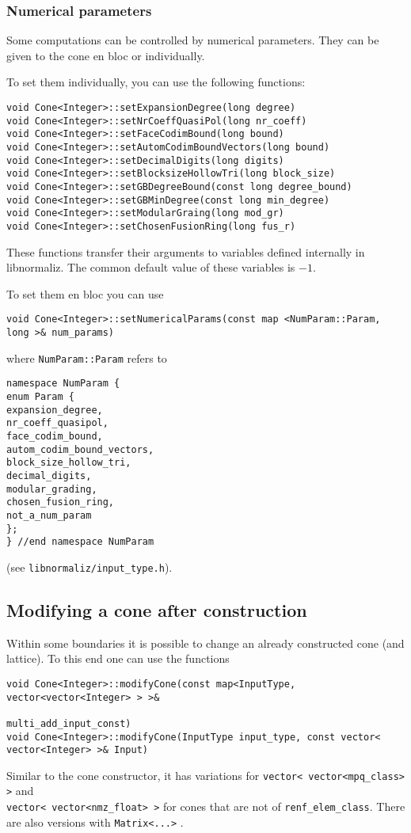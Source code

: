 \begin{small}
\subsubsection{Numerical parameters}\label{num_params}

Some computations can be controlled by numerical parameters. They can be given to the cone en bloc or individually.

To set them individually, you can use the following functions:
\begin{Verbatim}
void Cone<Integer>::setExpansionDegree(long degree)
void Cone<Integer>::setNrCoeffQuasiPol(long nr_coeff)
void Cone<Integer>::setFaceCodimBound(long bound)
void Cone<Integer>::setAutomCodimBoundVectors(long bound)
void Cone<Integer>::setDecimalDigits(long digits)
void Cone<Integer>::setBlocksizeHollowTri(long block_size)
void Cone<Integer>::setGBDegreeBound(const long degree_bound)
void Cone<Integer>::setGBMinDegree(const long min_degree)
void Cone<Integer>::setModularGraing(long mod_gr)
void Cone<Integer>::setChosenFusionRing(long fus_r)
\end{Verbatim}
These functions transfer their arguments to variables defined internally in libnormaliz. The common default value of these variables is $-1$.

To set them en bloc you can use
\begin{Verbatim}
void Cone<Integer>::setNumericalParams(const map <NumParam::Param, long >& num_params)
\end{Verbatim}
where \verb|NumParam::Param| refers to
\begin{Verbatim}
namespace NumParam {
enum Param {
expansion_degree,
nr_coeff_quasipol,
face_codim_bound,
autom_codim_bound_vectors,
block_size_hollow_tri,
decimal_digits,
modular_grading,
chosen_fusion_ring,
not_a_num_param
};
} //end namespace NumParam
\end{Verbatim}
(see \verb|libnormaliz/input_type.h|).

\subsection{Modifying a cone after construction}\label{Modify}

Within some boundaries it is possible to change an already constructed cone (and lattice). To this end one can use the functions
\begin{Verbatim}
void Cone<Integer>::modifyCone(const map<InputType, vector<vector<Integer> > >& 
                                                           multi_add_input_const)
void Cone<Integer>::modifyCone(InputType input_type, const vector< vector<Integer> >& Input)
\end{Verbatim}
Similar to the cone constructor, it has variations for \verb|vector< vector<mpq_class> >| and\\ \verb|vector< vector<nmz_float> >| for cones that are not of \verb|renf_elem_class|. There are also versions with \verb|Matrix<...>| .


\end{small}
